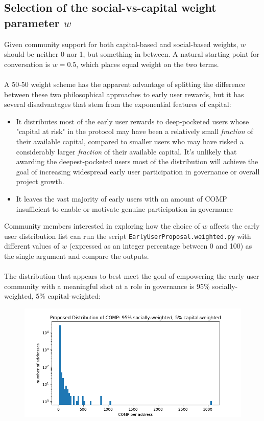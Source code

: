 \documentclass[12pt]{article}
\begin{document}
\subsection{Selection of the social-vs-capital weight parameter $w$}

Given community support for both capital-based and social-based weights,
$w$ should be neither 0 nor 1, but something in between. A natural starting
point for conversation is $w = 0.5$, which places equal weight on the two terms.
\\\\
A 50-50 weight scheme has the apparent advantage of splitting the difference
between these two philosophical approaches to early user rewards, but it has
several disadvantages that stem from the exponential features of capital:
\begin{itemize}
  \item{It distributes most of the early user rewards to deep-pocketed
        users whose "capital at risk" in the protocol may have been a
        relatively small {\em fraction} of their available capital,
        compared to smaller users who may have risked a considerably larger
        {\em fraction} of their available capital. It's unlikely that
        awarding the deepest-pocketed users most of the distribution will
        achieve the goal of increasing widespread early user participation
        in governance or overall project growth.}
  \item{It leaves the vast majority of early users with an amount of COMP
        insufficient to enable or motivate genuine participation in governance}
\end{itemize}

Community members interested in exploring how the choice of $w$ affects the
early user distribution list can run the script \texttt{EarlyUserProposal.weighted.py}
with different values of $w$ (expressed as an integer percentage between 0 and 100)
as the single argument and compare the outputs.
\\\\
The distribution that appears to best meet the goal of empowering the
early user community with a meaningful shot at a role in governance is
95\% socially-weighted, 5\% capital-weighted:

\begin{figure}[h]
 \centering
 \includegraphics[width=5in]{proposals/Proposal.png}
\end{figure}
\end{document}
